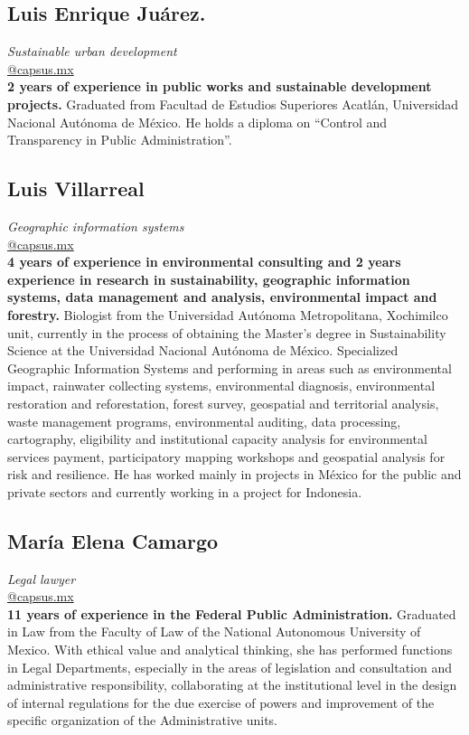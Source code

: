 \documentclass[
	a4paper,
	12pt,
	unnumberedsections,
]{CSSullivanBusinessReport}
\begin{document}
\subsection*{Luis Enrique Juárez.}
\textit{Sustainable urban development} \\
\href{mailto:@capsus.mx}{@capsus.mx} \\[0.5em]
\textbf{2 years of experience in public works and sustainable development projects.} Graduated from Facultad de Estudios Superiores Acatlán, Universidad Nacional Autónoma de México. He holds a diploma on “Control and Transparency in Public Administration”.

\subsection*{Luis Villarreal}
\textit{Geographic information systems} \\
\href{mailto:@capsus.mx}{@capsus.mx} \\[0.5em]
\textbf{4 years of experience in environmental consulting and 2 years experience in research in sustainability, geographic information systems, data management and analysis, environmental impact and forestry.} Biologist from the Universidad Autónoma Metropolitana, Xochimilco unit, currently in the process of obtaining the Master’s degree in Sustainability Science at the Universidad Nacional Autónoma de México. Specialized Geographic Information Systems and performing in areas such as environmental impact, rainwater collecting systems, environmental diagnosis, environmental restoration and reforestation, forest survey, geospatial and territorial analysis, waste management programs, environmental auditing, data processing,  cartography, eligibility and institutional capacity analysis for environmental services payment, participatory mapping workshops and geospatial analysis for risk and resilience. He has worked mainly in projects in México for the public and private sectors and currently working in a project for Indonesia.

\subsection*{María Elena Camargo}
\textit{Legal lawyer} \\
\href{mailto:@capsus.mx}{@capsus.mx} \\[0.5em]
\textbf{11 years of experience in the Federal Public Administration.} Graduated in Law from the Faculty of Law of the National Autonomous University of Mexico. With ethical value and analytical thinking, she has performed functions in Legal Departments, especially in the areas of legislation and consultation and administrative responsibility, collaborating at the institutional level in the design of internal regulations for the due exercise of powers and improvement of the specific organization of the Administrative units.
\end{document}
